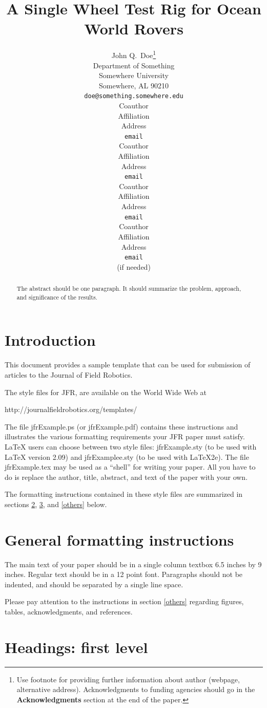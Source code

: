\documentclass{article}
\title{A Single Wheel Test Rig for Ocean World Rovers}
\author{
John Q.~Doe\thanks{ Use footnote for providing further information
about author (webpage, alternative address). Acknowledgments to
funding agencies should go in the \textbf{Acknowledgments} section
at the end of the paper.} \\
Department of Something\\
Somewhere University\\
Somewhere, AL 90210 \\
\texttt{doe@something.somewhere.edu} \\
\And
Coauthor \\
Affiliation \\
Address \\
\texttt{email} \\
\AND
Coauthor \\
Affiliation \\
Address \\
\texttt{email} \\
\And
Coauthor \\
Affiliation \\
Address \\
\texttt{email} \\
\And
Coauthor \\
Affiliation \\
Address \\
\texttt{email} \\
(if needed)\\
}
\begin{document}
\maketitle

\begin{abstract}
The abstract should be one paragraph. It should summarize the
problem, approach, and significance of the results.
\end{abstract}

\section{Introduction}

This document provides a sample template that can be used for
submission of articles to the Journal of Field Robotics.

The style files for JFR, are available on the World Wide Web at
\begin{center}
   http://journalfieldrobotics.org/templates/
\end{center}
The file jfrExample.ps (or jfrExample.pdf) contains these
instructions and illustrates the various formatting requirements
your JFR paper must satisfy. \LaTeX{} users can choose between two
style files: jfrExample.sty (to be used with \LaTeX{} version 2.09)
and jfrExamplee.sty (to be used with \LaTeX{}2e). The file
jfrExample.tex may be used as a ``shell'' for writing your paper.
All you have to do is replace the author, title, abstract, and text
of the paper with your own.

The formatting instructions contained in these style files are summarized in
sections \ref{gen_inst}, \ref{headings}, and \ref{others} below.

\section{General formatting instructions}
\label{gen_inst}

The main text of your paper should be in a single column textbox 6.5
inches by 9 inches. Regular text should be in a 12 point font.
Paragraphs should not be indented, and should be separated by a
single line space.

Please pay attention to the instructions in section \ref{others}
regarding figures, tables, acknowledgments, and references.

\section{Headings: first level}
\label{headings}
\end{document}
